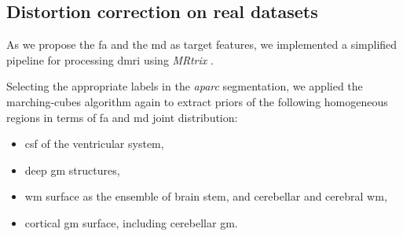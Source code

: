 \subsection*{Distortion correction on real datasets}
\label{sec:results_hcp}

As we propose the \gls*{fa} and the \gls*{md} as target features, we
  implemented a simplified pipeline for processing \gls*{dmri} using
  \emph{MRtrix} \citep{tournier_mrtrix_2012}.

Selecting the appropriate labels in the \emph{aparc} segmentation, we applied
  the marching-cubes algorithm again to extract priors of the following
  homogeneous regions in terms of \gls*{fa} and \gls*{md} joint distribution:
\begin{itemize}
	\item \gls*{csf} of the ventricular system,
	\item deep \gls*{gm} structures,
	\item \gls*{wm} surface as the ensemble of brain stem, and
	  cerebellar and cerebral \gls*{wm},
	\item cortical \gls*{gm} surface, including cerebellar \gls*{gm}.
\end{itemize}